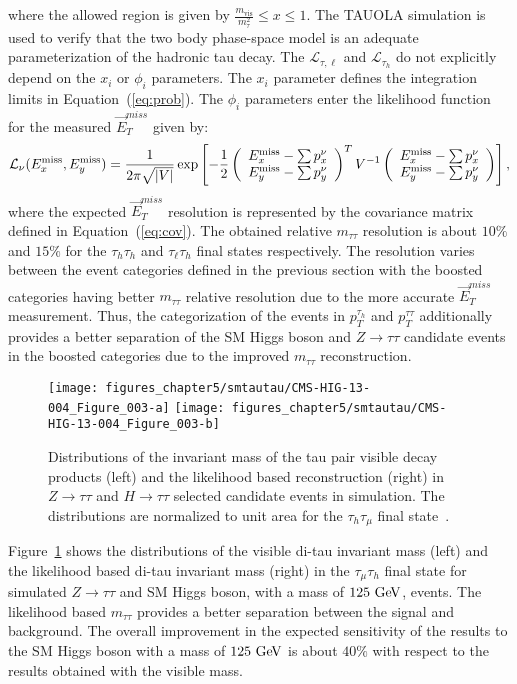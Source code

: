 where the allowed region is given by $\frac{m_{\mathrm{vis}}}{m_{\tau}^2}\leq x \leq 1$. The TAUOLA simulation is used to verify that the two body phase-space model is an adequate parameterization of the hadronic tau decay. The $\mathcal{L}_{\tau,\ell}$  and $\mathcal{L}_{\tau_{h}}$  do not explicitly depend on the $x_i$ or $\phi_i$ parameters. The $x_i$ parameter defines the integration limits in Equation~(\ref{eq:prob}). The $\phi_i$ parameters enter the likelihood function for the measured $\vec{E}_{T}^{miss}$ given by:
\begin{equation}
\mathcal{L}_{\nu} (E_{x}^{\rm miss}, E_{y}^{\rm miss}) = \frac{1}{2 \pi \sqrt{\vert V \vert}} 
 \exp \left[ -\frac{1}{2}
 \left( \begin{array}{c} E_{x}^{\rm miss} - \sum p_{x}^{\nu} \\ E_{y}^{\rm miss} - \sum p_{y}^{\nu} \end{array} \right)^{T}
 V^{-1} 
 \left( \begin{array}{c} E_{x}^{\rm miss} - \sum p_{x}^{\nu} \\ E_{y}^{\rm miss} - \sum p_{y}^{\nu} \end{array} \right)
\right],
\end{equation}
where the expected $\vec{E}_{T}^{miss}$ resolution is represented by the covariance matrix defined in Equation~(\ref{eq:cov}). The obtained relative $m_{\tau\tau}$ resolution is about $10\%$ and $15\%$ for the $\tau_h\tau_h$ and $\tau_{\ell}\tau_h$ final states respectively. The resolution varies between the event categories defined in the previous section with the boosted categories having better $m_{\tau\tau}$ relative resolution due to the more accurate $\vec{E}_{T}^{miss}$ measurement. Thus, the categorization of the events in $p_{T}^{\tau_h}$ and  $p_{T}^{\tau\tau}$ additionally provides a better separation of the SM Higgs boson and $Z\rightarrow \tau\tau$ candidate events in the boosted categories due to the improved $m_{\tau\tau}$ reconstruction.   
\begin{figure}[htbp]
\centering
\texttt{[image: figures\_chapter5/smtautau/CMS-HIG-13-004\_Figure\_003-a]}
\texttt{[image: figures\_chapter5/smtautau/CMS-HIG-13-004\_Figure\_003-b]}
\caption{Distributions of the invariant mass of the tau pair visible decay products (left) and the likelihood based reconstruction (right) in $Z \rightarrow \tau\tau$ and $H \rightarrow \tau\tau$ selected candidate events in simulation. The distributions are normalized to unit area for the $\tau_{h}\tau_{\mu}$ final state~\cite{Chatrchyan:2014nva}.}
\label{fig:svfit}
\end{figure}
Figure~\ref{fig:svfit} shows the distributions of the visible di-tau invariant mass (left) and the likelihood based di-tau invariant mass (right) in the $\tau_{\mu}\tau_h$ final state for simulated $Z \rightarrow \tau\tau$ and SM Higgs boson, with a mass of $125~\mathrm{Ge\kern -0.1em V}$, events. The likelihood based $m_{\tau\tau}$ provides a better separation between the signal and background. The overall improvement in the expected sensitivity of the results to the SM Higgs boson with a mass of $125~\mathrm{Ge\kern -0.1em V}$ is about $40\%$ with respect to the results obtained with the visible mass.  

